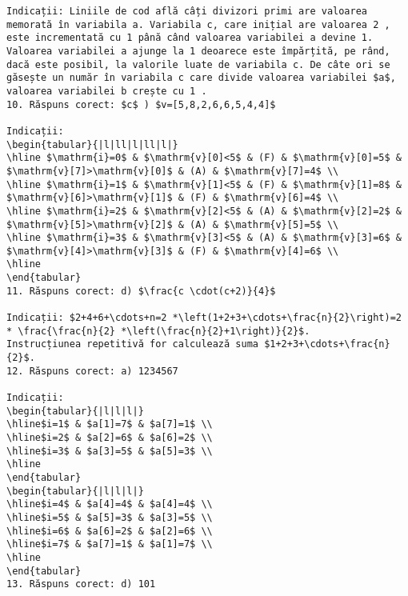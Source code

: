 \begin{verbatim}
Indicații: Liniile de cod află câți divizori primi are valoarea memorată în variabila a. Variabila c, care inițial are valoarea 2 , este incrementată cu 1 până când valoarea variabilei a devine 1. Valoarea variabilei a ajunge la 1 deoarece este împărțită, pe rând, dacă este posibil, la valorile luate de variabila c. De câte ori se găsește un număr în variabila c care divide valoarea variabilei $a$, valoarea variabilei b crește cu 1 .
10. Răspuns corect: $c$ ) $v=[5,8,2,6,6,5,4,4]$

Indicații:
\begin{tabular}{|l|ll|l|ll|l|}
\hline $\mathrm{i}=0$ & $\mathrm{v}[0]<5$ & (F) & $\mathrm{v}[0]=5$ & $\mathrm{v}[7]>\mathrm{v}[0]$ & (A) & $\mathrm{v}[7]=4$ \\
\hline $\mathrm{i}=1$ & $\mathrm{v}[1]<5$ & (F) & $\mathrm{v}[1]=8$ & $\mathrm{v}[6]>\mathrm{v}[1]$ & (F) & $\mathrm{v}[6]=4$ \\
\hline $\mathrm{i}=2$ & $\mathrm{v}[2]<5$ & (A) & $\mathrm{v}[2]=2$ & $\mathrm{v}[5]>\mathrm{v}[2]$ & (A) & $\mathrm{v}[5]=5$ \\
\hline $\mathrm{i}=3$ & $\mathrm{v}[3]<5$ & (A) & $\mathrm{v}[3]=6$ & $\mathrm{v}[4]>\mathrm{v}[3]$ & (F) & $\mathrm{v}[4]=6$ \\
\hline
\end{tabular}
11. Răspuns corect: d) $\frac{c \cdot(c+2)}{4}$

Indicații: $2+4+6+\cdots+n=2 *\left(1+2+3+\cdots+\frac{n}{2}\right)=2 * \frac{\frac{n}{2} *\left(\frac{n}{2}+1\right)}{2}$.
Instrucțiunea repetitivă for calculează suma $1+2+3+\cdots+\frac{n}{2}$.
12. Răspuns corect: a) 1234567

Indicații:
\begin{tabular}{|l|l|l|}
\hline$i=1$ & $a[1]=7$ & $a[7]=1$ \\
\hline$i=2$ & $a[2]=6$ & $a[6]=2$ \\
\hline$i=3$ & $a[3]=5$ & $a[5]=3$ \\
\hline
\end{tabular}
\begin{tabular}{|l|l|l|}
\hline$i=4$ & $a[4]=4$ & $a[4]=4$ \\
\hline$i=5$ & $a[5]=3$ & $a[3]=5$ \\
\hline$i=6$ & $a[6]=2$ & $a[2]=6$ \\
\hline$i=7$ & $a[7]=1$ & $a[1]=7$ \\
\hline
\end{tabular}
13. Răspuns corect: d) 101


\end{verbatim}
